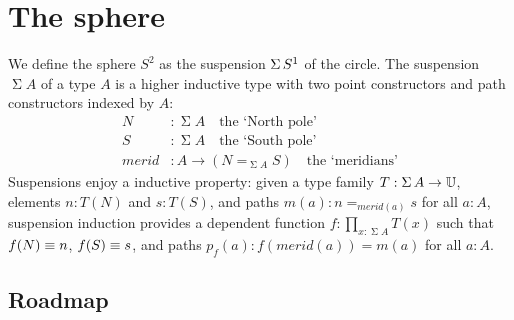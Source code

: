 \documentclass[english,a4]{article}
\def\U{\universe U}%
\begin{document}
\section{The sphere}
\newcommand{\Sp}{{S^2}}%
\newcommand{\mrd}{\mathit{merid}}%
\newcommand{\susp}[1]{\operatorname{\Sigma}{#1}}%
\newcommand{\Truncset}[1]{{\Trunc{#1}}_0}%
\newcommand{\truncset}[1]{{\trunc{#1}}_0}%
\newcommand{\Truncprop}[1]{\Trunc{#1}}%
\newcommand{\truncprop}[1]{\trunc{#1}}%
\newcommand{\ptdto}{\to_\ast}%
\newcommand{\flip}{\operatorname{flip}}%
\newcommand{\conncomp}[2]{{#1}_{(#2)}}%
%
We define the sphere $\Sp$ as the suspension $\susp\Sc$ of the circle.
The suspension $\susp A$ of a type $A$ is a higher inductive type 
with two point constructors and path constructors indexed by $A$:
\begin{align}
  \label{eq:suspension}
  N &: \susp A \quad\text{the `North pole'}\\
  S &: \susp A \quad\text{the `South pole'}\\
  \mrd &: A \to (N =_{\susp A} S) \quad\text{the `meridians'}
\end{align}
Suspensions enjoy a inductive property: given a type family
$T : \susp A \to \U$, elements $n:T(N)$ and $s:T(S)$, and paths
$m(a) : n=_{\mrd(a)}s$ for all $a:A$, 
suspension induction provides a dependent
function $f : \prod_{x:\susp A}T(x)$ such that $f(N) \equiv n$, $f(S) \equiv s$,
and paths $p_f(a): f(\mrd(a)) = m(a)$ for all $a:A$.

\subsection{Roadmap}
\label{sec:roadmap}
\end{document}
